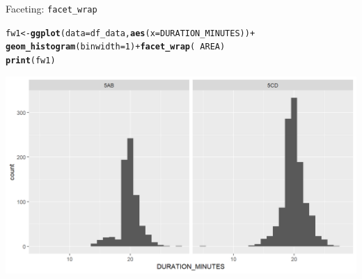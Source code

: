 \documentclass{beamer}\usepackage[]{graphicx}\usepackage[]{color}
\makeatletter
\newcommand{\hlnum}[1]{\textcolor[rgb]{0.686,0.059,0.569}{#1}}%
\newcommand{\hlopt}[1]{\textcolor[rgb]{0,0,0}{#1}}%
\newcommand{\hlstd}[1]{\textcolor[rgb]{0.345,0.345,0.345}{#1}}%
\newcommand{\hlkwb}[1]{\textcolor[rgb]{0.69,0.353,0.396}{#1}}%
\newcommand{\hlkwc}[1]{\textcolor[rgb]{0.333,0.667,0.333}{#1}}%
\newcommand{\hlkwd}[1]{\textcolor[rgb]{0.737,0.353,0.396}{\textbf{#1}}}%
\newenvironment{kframe}{%
 \def\at@end@of@kframe{}%
 \ifinner\ifhmode%
  \def\at@end@of@kframe{\end{minipage}}%
  \begin{minipage}{\columnwidth}%
 \fi\fi%
 \def\FrameCommand##1{\hskip\@totalleftmargin \hskip-\fboxsep
 \colorbox{shadecolor}{##1}\hskip-\fboxsep
     \hskip-\linewidth \hskip-\@totalleftmargin \hskip\columnwidth}%
 \MakeFramed {\advance\hsize-\width
   \@totalleftmargin\z@ \linewidth\hsize
   \@setminipage}}%
 {\par\unskip\endMakeFramed%
 \at@end@of@kframe}
\newenvironment{knitrout}{}{} %
\makeatother
\begin{document}
\begin{frame}[fragile]{Faceting: \lstinline{facet_wrap}}
\begin{knitrout}\footnotesize
{}\color{fgcolor}\begin{kframe}
\begin{alltt}
\hlstd{fw1} \hlkwb{<-} \hlkwd{ggplot}\hlstd{(}\hlkwc{data}\hlstd{=df_data,} \hlkwd{aes}\hlstd{(}\hlkwc{x}\hlstd{=DURATION_MINUTES))} \hlopt{+}
  \hlkwd{geom_histogram}\hlstd{(}\hlkwc{binwidth}\hlstd{=}\hlnum{1}\hlstd{)} \hlopt{+} \hlkwd{facet_wrap}\hlstd{(}\hlopt{~} \hlstd{AREA)}
\hlkwd{print}\hlstd{(fw1)}
\end{alltt}
\end{kframe}

{\centering \includegraphics[width=.9\linewidth]{figure/facet_wrap_1-1} 

}



\end{knitrout}
\end{frame}
\end{document}
